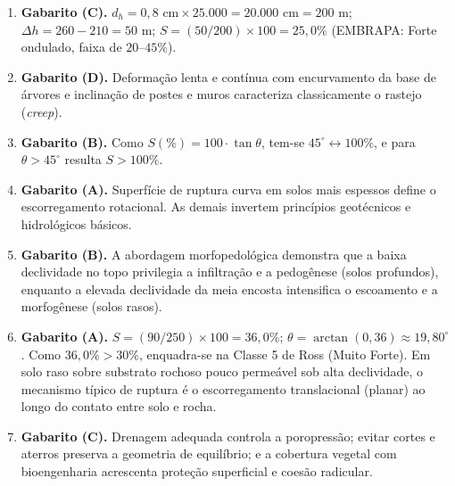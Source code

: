 \begin{boxGabarito}
\begin{enumerate}[leftmargin=1.8em, itemsep=3.5pt]
  \item \textbf{Gabarito (C).} $d_h = 0{,}8\text{ cm} \times 25.000 = 20.000\text{ cm} = 200\text{ m}$; $\Delta h = 260 - 210 = 50\text{ m}$; $S = (50 / 200)\times 100 = 25{,}0\%$ (EMBRAPA: Forte ondulado, faixa de $20\text{--}45\%$).

  \item \textbf{Gabarito (D).} Deformação lenta e contínua com encurvamento da base de árvores e inclinação de postes e muros caracteriza classicamente o rastejo (\textit{creep}).

  \item \textbf{Gabarito (B).} Como $S(\%) = 100\cdot\tan\theta$, tem-se $45^\circ \leftrightarrow 100\%$, e para $\theta > 45^\circ$ resulta $S > 100\%$.

  \item \textbf{Gabarito (A).} Superfície de ruptura curva em solos mais espessos define o escorregamento rotacional. As demais invertem princípios geotécnicos e hidrológicos básicos.

  \item \textbf{Gabarito (B).} A abordagem morfopedológica demonstra que a baixa declividade no topo privilegia a infiltração e a pedogênese (solos profundos), enquanto a elevada declividade da meia encosta intensifica o escoamento e a morfogênese (solos rasos).

  \item \textbf{Gabarito (A).} $S = (90 / 250)\times 100 = 36{,}0\%$; $\theta = \arctan(0{,}36) \approx 19{,}80^\circ$. Como $36{,}0\% > 30\%$, enquadra-se na Classe 5 de Ross (Muito Forte). Em solo raso sobre substrato rochoso pouco permeável sob alta declividade, o mecanismo típico de ruptura é o escorregamento translacional (planar) ao longo do contato entre solo e rocha.

  \item \textbf{Gabarito (C).} Drenagem adequada controla a poropressão; evitar cortes e aterros preserva a geometria de equilíbrio; e a cobertura vegetal com bioengenharia acrescenta proteção superficial e coesão radicular.
\end{enumerate}
\end{boxGabarito}

